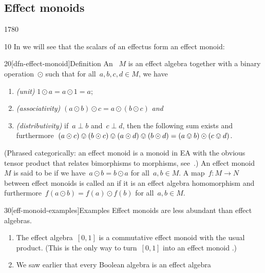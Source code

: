 \subsection{Effect monoids}
\begin{parsec}{1780}%
\begin{point}{10}%
In  we will see that the scalars of an effectus
form an effect monoid:
\end{point}
\begin{point}{20}[dfn-effect-monoid]{Definition}%
An ~$M$ \cite{probdistrconv}
    is an effect algebra
    together with a binary operation~$\odot$
    such that for all~$a,b,c,d \in M$, we have
\begin{enumerate}
    \item \emph{(unit)}
    $1 \odot a = a \odot 1 = a$;
\item \emph{(associativity)}
    $(a \odot b) \odot c 
    =a \odot (b \odot c)$ \emph{and}
\item \emph{(distributivity)}
    if~$a \perp b$ and~$c \perp d$,
        then the following sum exists and
        furthermore~$(a \odot c) \ovee (b \odot c) \ovee
            (a \odot d) \ovee (b \odot d) = (a \ovee b) \odot (c \ovee d)$.
\end{enumerate}
(Phrased categorically:
    an effect monoid is a monoid in \textsf{EA}
    with the obvious tensor product
    that relates bimorphisms to morphisms,
    see~\cite{corefl,probdistrconv}.)
An effect monoid~$M$ is said to be 
    if we have~$a\odot b = b\odot a$ for all~$a,b \in M$.
A map~$f\colon M \to N$ between effect monoids
    is called an 
    if it is an effect algebra homomorphism
    and furthermore~$f(a \odot b) = f(a) \odot f(b)$
    for all~$a,b \in M$.
\end{point}
\begin{point}{30}[eff-monoid-examples]{Examples}%
Effect monoids are less abundant than effect algebras.
\begin{enumerate}
\item The effect algebra~$[0,1]$
        is a commutative effect monoid with the usual product.
        (This is the only way to turn~$[0,1]$ into an effect monoid
                \cite[prop.~41]{basmsc}.)
\item We saw earlier that every Boolean algebra is an effect algebra

\end{enumerate}
\end{point}
\end{parsec}
